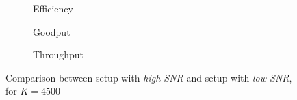 \begin{figure}[!h]
\centering
\begin{subfigure}{0.23\textwidth}
	\captionsetup{justification=centering,font=scriptsize}
	\centering
	\setlength\fwidth{\textwidth}
	\setlength{}
	
	\caption{Efficiency}
	\label{fig:wifi_eff_lsnr_4500}
\end{subfigure}\hspace{2em}%
\begin{subfigure}{0.23\textwidth}
	\captionsetup{justification=centering,font=scriptsize}
	\centering
	\setlength\fwidth{\textwidth}
	\setlength{}
	
	\caption{Goodput}
	\label{fig:wifi_good_lsnr_4500}
\end{subfigure}\hspace{2em}%
\begin{subfigure}{0.23\textwidth}
	\captionsetup{justification=centering,font=scriptsize}
	\centering
	\setlength\fwidth{\textwidth}
	\setlength{}
	
	\caption{Throughput}
	\label{fig:wifi_thr_lsnr_4500}
\end{subfigure}
\caption{Comparison between setup with \textit{high SNR} and setup with \textit{low SNR}, for $K=4500$}
\label{fig:wifi_lsnr_4500}
\end{figure}


